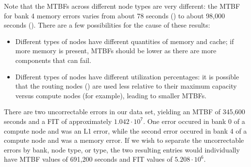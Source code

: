 Note that the MTBFs across different node types are very different: the MTBF for bank 4 memory errors varies from about 78 seconds () to about 98,000 seconds ().  There are a few possibilities for the cause of these results:

\begin{itemize}
\item Different types of nodes have different quantities of memory and cache; if more memory is present, MTBFs should be lower as there are more components that can fail.
\item Different types of nodes have different utilization percentages: it is possible that the routing nodes () are used less relative to their maximum capacity versus compute nodes (for example), leading to smaller MTBFs.
\end{itemize}

There are two uncorrectable errors in our data set, yielding an MTBF of 345,600 seconds and a FIT of approximately $1.042 \cdot 10^7$.  One error occured in bank 0 of a compute node and was an L1 error, while the second error occured in bank 4 of a compute node and was a memory error.  If we wish to separate the uncorrectable errors by bank, node type, or type, the two resulting entries would individually have MTBF values of 691,200 seconds and FIT values of $5.208 \cdot 10^6$.
